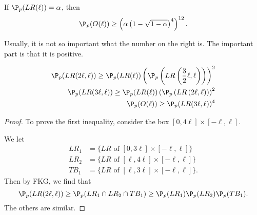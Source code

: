 \documentclass[a4paper]{article}
\begin{document}
\begin{thm}
  If $\P_p(LR(\ell)) = \alpha$, then
  \[
    \P_p(O(\ell)) \geq \left(\alpha \left(1 - \sqrt{1 - \alpha}\right)^4\right)^{12}.
  \]
\end{thm}
Usually, it is not so important what the number on the right is. The important part is that it is positive.

\begin{lemma}
  \begin{align*}
    \P_p(LR(2\ell ,\ell)) \geq \P_p(LR(\ell)) \left(\P_p\left(LR\left(\frac{3}{2}\ell, \ell\right)\right)\right)^2\\
    \P_p(LR(3\ell ,\ell)) \geq \P_p(LR(\ell)) \left(\P_p\left(LR\left(2\ell, \ell\right)\right)\right)^2\\
    \P_p(O(\ell)) \geq \P_p(LR(3\ell, \ell))^4
  \end{align*}
\end{lemma}

\begin{proof}\leavevmode
  To prove the first inequality, consider the box $[0, 4\ell] \times [-\ell, \ell]$.
  \begin{center}
  \end{center} %
  We let
  \begin{align*}
    LR_1 &= \{LR\text{ of }[0, 3\ell] \times [-\ell, \ell]\}\\
    LR_2 &= \{LR\text{ of }[\ell, 4\ell] \times [-\ell, \ell]\}\\
    TB_1 &= \{LR\text{ of }[\ell, 3\ell] \times [-\ell, \ell]\}.
  \end{align*}
  Then by FKG, we find that
  \[
    \P_p(LR(2\ell, \ell)) \geq \P_p(LR_1 \cap LR_2 \cap TB_1) \geq \P_p(LR_1) \P_p(LR_2) \P_p(TB_1).
  \]
  The others are similar.
\end{proof}
\end{document}
